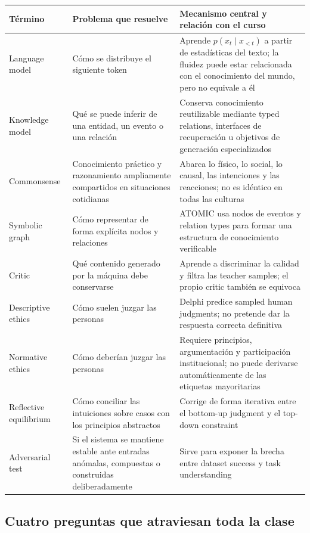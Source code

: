 \begin{longtable}{@{}L{0.19\textwidth}L{0.27\textwidth}L{0.42\textwidth}@{}}
\toprule
Término & Problema que resuelve & Mecanismo central y relación con el curso \\
\midrule
Language model & Cómo se distribuye el siguiente token & Aprende $p(x_t\mid x_{<t})$ a partir de estadísticas del texto; la fluidez puede estar relacionada con el conocimiento del mundo, pero no equivale a él \\
Knowledge model & Qué se puede inferir de una entidad, un evento o una relación & Conserva conocimiento reutilizable mediante typed relations, interfaces de recuperación u objetivos de generación especializados \\
Commonsense & Conocimiento práctico y razonamiento ampliamente compartidos en situaciones cotidianas & Abarca lo físico, lo social, lo causal, las intenciones y las reacciones; no es idéntico en todas las culturas \\
Symbolic graph & Cómo representar de forma explícita nodos y relaciones & ATOMIC usa nodos de eventos y relation types para formar una estructura de conocimiento verificable \\
Critic & Qué contenido generado por la máquina debe conservarse & Aprende a discriminar la calidad y filtra las teacher samples; el propio critic también se equivoca \\
Descriptive ethics & Cómo suelen juzgar las personas & Delphi predice sampled human judgments; no pretende dar la respuesta correcta definitiva \\
Normative ethics & Cómo deberían juzgar las personas & Requiere principios, argumentación y participación institucional; no puede derivarse automáticamente de las etiquetas mayoritarias \\
Reflective equilibrium & Cómo conciliar las intuiciones sobre casos con los principios abstractos & Corrige de forma iterativa entre el bottom-up judgment y el top-down constraint \\
Adversarial test & Si el sistema se mantiene estable ante entradas anómalas, compuestas o construidas deliberadamente & Sirve para exponer la brecha entre dataset success y task understanding \\
\bottomrule
\end{longtable}

\subsection{Cuatro preguntas que atraviesan toda la clase}


